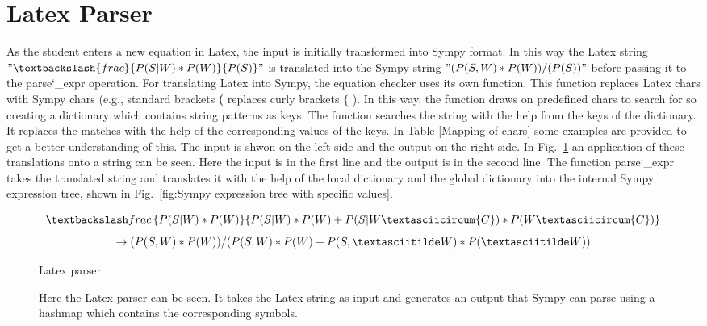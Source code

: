         \section{Latex Parser}
        \label{latexparser}
        As the student enters a new equation in Latex, the input is initially transformed into Sympy format.
        In this way the Latex string $"\textbackslash{frac}\{P(S|W)*P(W)\}\{P(S)\}"$ is translated into the Sympy string $"(P(S,W)*P(W))/(P(S))"$ before passing it to the
        parse\char`_expr operation. For translating Latex into Sympy, the equation checker uses its own function. This function replaces Latex chars with Sympy chars (e.g.,
        standard brackets \textbf{(} replaces curly brackets \textbf{$\{$} ). In this way, the function draws on predefined chars to search for so creating a dictionary which contains
        string patterns as keys. The function searches the string with the help from the keys of the dictionary.
        It replaces the matches with the help of the corresponding values of the keys. In Table \ref{Mapping of chars} some examples are provided to get a better understanding of this.
        The input is shwon on the left side and the output on the right side.
        In Fig.~\ref{fig:Application of dedicated Sympy parser} an application of these translations onto a string can be seen. Here the input is in the first line and the output is in the second line.
        The function parse\char`_expr takes the translated string and translates it with the help of the local dictionary and the global dictionary
        into the internal Sympy expression tree, shown in Fig.~\ref{fig:Sympy expression tree with specific values}.
        \begin{figure}[h]
            \begin{center}
                \[\textbackslash frac\,\{P(S|W)*P(W)\}\{P(S|W)*P(W)+P(S|W\textasciicircum\{C\})*P(W\textasciicircum\{C\})\}\]
                \[\rightarrow (P(S,W)*P(W))/(P(S,W)*P(W)+P(S,\textasciitilde W)*P(\textasciitilde W))\]
            \end{center}
            \caption{Latex parser}
            \caption*{Here the Latex parser can be seen. It takes the Latex string as input and generates an output that Sympy can parse using a hashmap which contains
            the corresponding symbols.} \label{fig:Application of dedicated Sympy parser}
        \end{figure}

